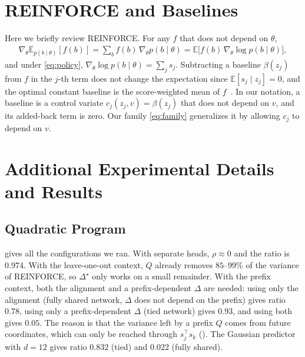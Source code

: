 \documentclass[10pt]{article}
\providecommand{\E}{\mathbb{E}}
\theoremstyle{plain}
\theoremstyle{definition}
\theoremstyle{remark}
\theoremstyle{definition}
\newcommand{\ctx}[1]{z_{#1}}                 %
\newcommand{\score}[1]{s_{#1}}               %
\newcommand{\Dstar}{\Delta^{\star}}
\begin{document}
\appendix
\section{REINFORCE and Baselines}\label{sec:reinforce}
Here we briefly review REINFORCE. For any $f$ that does not depend on $\theta$,
\begin{align}
    \nabla_\theta\E_{p(b\mid\theta)}[f(b)]=\sum_b f(b)\,\nabla_\theta p(b\mid\theta)=\E\big[f(b)\,\nabla_\theta\log p(b\mid\theta)\big],
\end{align}
and under \eqref{eq:policy}, $\nabla_\theta\log p(b\mid\theta)=\sum_j\score{j}$. Subtracting a baseline $\beta(\ctx{j})$ from $f$ in the $j$-th term does not change the expectation since $\E[\score{j}\mid\ctx{j}]=0$, and the optimal constant baseline is the score-weighted mean of $f$~\cite{weaver2001,greensmith2004}. In our notation, a baseline is a control variate $c_j(\ctx{j},v)=\beta(\ctx{j})$ that does not depend on $v$, and its added-back term is zero. Our family \eqref{eq:family} generalizes it by allowing $c_j$ to depend on $v$.

\section{Additional Experimental Details and Results}\label{app:exp}

\subsection{Quadratic Program}
 gives all the configurations we ran. With separate heads, $\rho\approx0$ and the ratio is $0.974$. With the leave-one-out context, $Q$ already removes $85$--$99\%$ of the variance of REINFORCE, so $\Dstar$ only works on a small remainder. With the prefix context, both the alignment and a prefix-dependent $\Delta$ are needed: using only the alignment (fully shared network, $\Delta$ does not depend on the prefix) gives ratio $0.78$, using only a prefix-dependent $\Delta$ (tied network) gives $0.93$, and using both gives $0.05$. The reason is that the variance left by a prefix $Q$ comes from future coordinates, which can only be reached through $\score{j}^{\top}\score{k}$ (). The Gaussian predictor with $d=12$ gives ratio $0.832$ (tied) and $0.022$ (fully shared).
\end{document}
